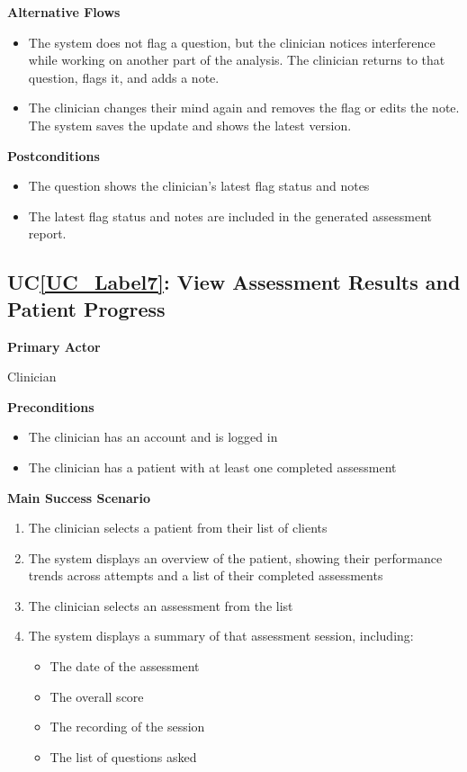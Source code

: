 \documentclass[12pt]{article}
\newcounter{ucnum} %
\newcommand{\ucref}[1]{UC\ref{#1}}
\begin{document}
\textbf{Alternative Flows}
\begin{itemize}
\item[3a.] The system does not flag a question, but the clinician notices interference while working on another part of the analysis. The clinician returns to that question, flags it, and adds a note.
\item[10a.] The clinician changes their mind again and removes the flag or edits the note. The system saves the update and shows the latest version.
\end{itemize}

\textbf{Postconditions}
\begin{itemize}
\item The question shows the clinician’s latest flag status and notes
\item The latest flag status and notes are included in the generated assessment report.
\end{itemize}

 \label{UC_Label7}
\subsection{\ucref{UC_Label7}: View Assessment Results and Patient Progress}

\textbf{Primary Actor}

Clinician

\textbf{Preconditions}
\begin{itemize}
\item The clinician has an account and is logged in
\item The clinician has a patient with at least one completed assessment
\end{itemize}

\textbf{Main Success Scenario}
\begin{enumerate}
\item The clinician selects a patient from their list of clients
\item The system displays an overview of the patient, showing their performance trends across attempts and a list of their completed assessments
\item The clinician selects an assessment from the list
\item The system displays a summary of that assessment session, including:
    \begin{itemize}
      \item The date of the assessment
      \item The overall score
      \item The recording of the session
      \item The list of questions asked
    \end{itemize}
\end{enumerate}
\end{document}

